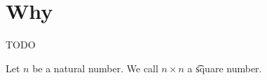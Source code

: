 
\section{Why}

TODO


Let $n$ be a natural number.
We call $n\times n$ a \t{square number}.

\blankpage
